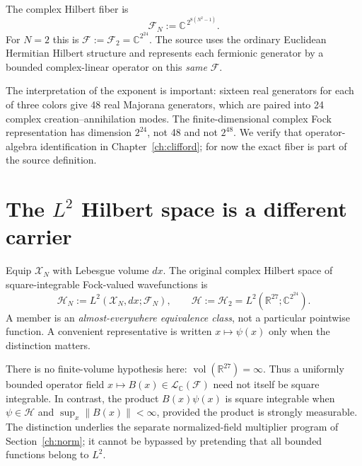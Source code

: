 \begin{definition}\label{def:fermion-carrier}
The complex Hilbert fiber is
\begin{equation}\label{eq:fermion-carrier}
 \mathcal F_N:=\mathbb C^{\,2^{8(N^2-1)}}.
\end{equation}
For $N=2$ this is $\mathcal F:=\mathcal F_2=\mathbb C^{2^{24}}$.
The source uses the ordinary Euclidean Hermitian Hilbert structure and
represents each fermionic generator by a bounded complex-linear operator on
this \emph{same} $\mathcal F$.
\end{definition}
The interpretation of the exponent is important: sixteen real generators
for each of three colors give 48 real Majorana generators, which are paired
into 24 complex creation--annihilation modes. The finite-dimensional complex
Fock representation has dimension $2^{24}$, not 48 and not $2^{48}$.
We verify that operator-algebra identification in Chapter~\ref{ch:clifford};
for now the exact fiber is part of the source definition.

\section[The L2 Hilbert space is a different carrier]{The $L^2$ Hilbert space is a different carrier}
\begin{definition}
Equip $\mathcal X_N$ with Lebesgue volume $dx$. The original complex Hilbert
space of square-integrable Fock-valued wavefunctions is
\begin{equation}\label{eq:full-l2}
 \mathscr H_N:=L^2(\mathcal X_N,dx;\mathcal F_N),\qquad
 \mathscr H:=\mathscr H_2=L^2(\mathbb R^{27};\mathbb C^{2^{24}}).
\end{equation}
A member is an \emph{almost-everywhere equivalence class}, not a particular
pointwise function. A convenient representative is written $x\mapsto\psi(x)$
only when the distinction matters.
\end{definition}

There is no finite-volume hypothesis here:
$\operatorname{vol}(\mathbb R^{27})=\infty$. Thus a uniformly bounded
operator field $x\mapsto B(x)\in\mathcal L_{\mathbb C}(\mathcal F)$ need not
itself be square integrable. In contrast, the product $B(x)\psi(x)$ is
square integrable when $\psi\in\mathscr H$ and
$\sup_x\|B(x)\|<\infty$, provided the product is strongly measurable.
The distinction underlies the separate normalized-field multiplier program
of Section~\ref{ch:norm}; it cannot be bypassed by pretending that all
bounded functions belong to $L^2$.

